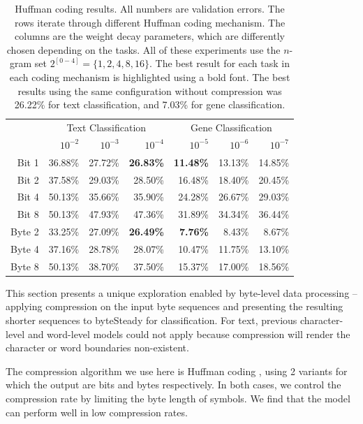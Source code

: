 \documentclass{article}
\begin{document}
\begin{table}[t]
  \caption{Huffman coding results. All numbers are validation errors. The rows iterate through different Huffman coding mechanism. The columns are the weight decay parameters, which are differently chosen depending on the tasks. All of these experiments use the \(n\)-gram set \(2^{[0-4]}=\{1,2,4,8,16\}\). The best result for each task in each coding mechanism is highlighted using a bold font. The best results using the same configuration without compression was 26.22\% for text classification, and 7.03\% for gene classification.}
  \label{tab:huffman}
  \begin{center}
    \begin{tabular}{r|rrr|rrr}
      \hline
      & \multicolumn{3}{|c}{Text Classification}  & \multicolumn{3}{|c}{Gene Classification} \\
      & \(10^{-2}\) & \(10^{-3}\) & \(10^{-4}\) & \(10^{-5}\) & \(10^{-6}\) & \(10^{-7}\) \\ \hline
      Bit 1 & 36.88\% & 27.72\% & \textbf{26.83\%} & \textbf{11.48\%} & 13.13\% & 14.85\% \\
      Bit 2 & 37.58\% & 29.03\% & 28.50\% & 16.48\% & 18.40\% & 20.45\% \\
      Bit 4 & 50.13\% & 35.66\% & 35.90\% & 24.28\% & 26.67\% & 29.03\% \\
      Bit 8 & 50.13\% & 47.93\% & 47.36\% & 31.89\% & 34.34\% & 36.44\% \\ \hline
      Byte 2 & 33.25\% & 27.09\% & \textbf{26.49\%} & \textbf{7.76\%} & 8.43\% & 8.67\% \\
      Byte 4 & 37.16\% & 28.78\% & 28.07\% & 10.47\% & 11.75\% & 13.10\% \\
      Byte 8 & 50.13\% & 38.70\% & 37.50\% & 15.37\% & 17.00\% & 18.56\% \\
    \hline
    \end{tabular}
  \end{center}
\end{table}

This section presents a unique exploration enabled by byte-level data processing -- applying compression on the input byte sequences and presenting the resulting shorter sequences to byteSteady for classification. For text, previous character-level and word-level models could not apply because compression will render the character or word boundaries non-existent.

The compression algorithm we use here is Huffman coding \cite{H52}, using 2 variants for which the output are bits and bytes respectively. In both cases, we control the compression rate by limiting the byte length of symbols. We find that the model can perform well in low compression rates.
\end{document}
